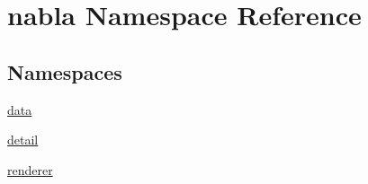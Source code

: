 \hypertarget{namespacenabla}{}\section{nabla Namespace Reference}
\label{namespacenabla}
\subsection*{Namespaces}
\begin{DoxyCompactItemize}
\item 
 \mbox{\hyperlink{namespacenabla_1_1data}{data}}
\item 
 \mbox{\hyperlink{namespacenabla_1_1detail}{detail}}
\item 
 \mbox{\hyperlink{namespacenabla_1_1renderer}{renderer}}
\end{DoxyCompactItemize}
